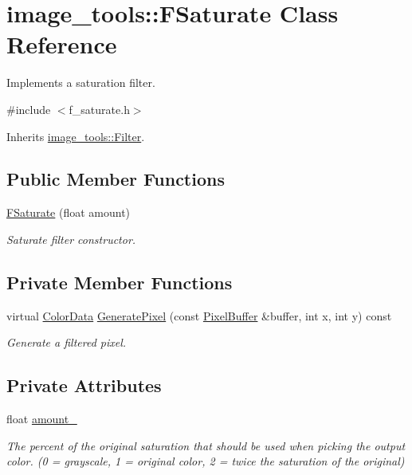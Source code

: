\hypertarget{classimage__tools_1_1FSaturate}{}\section{image\+\_\+tools\+:\+:F\+Saturate Class Reference}
\label{classimage__tools_1_1FSaturate}


Implements a saturation filter.  




{\ttfamily \#include $<$f\+\_\+saturate.\+h$>$}



Inherits \hyperlink{classimage__tools_1_1Filter}{image\+\_\+tools\+::\+Filter}.

\subsection*{Public Member Functions}
\begin{DoxyCompactItemize}
\item 
\hyperlink{classimage__tools_1_1FSaturate_a5940def93bf1851091ae93e949a34b7d}{F\+Saturate} (float amount)
\begin{DoxyCompactList}\small\item\em Saturate filter constructor. \end{DoxyCompactList}\end{DoxyCompactItemize}
\subsection*{Private Member Functions}
\begin{DoxyCompactItemize}
\item 
virtual \hyperlink{classimage__tools_1_1ColorData}{Color\+Data} \hyperlink{classimage__tools_1_1FSaturate_af576256575784ecbdf39109a0131e819}{Generate\+Pixel} (const \hyperlink{classimage__tools_1_1PixelBuffer}{Pixel\+Buffer} \&buffer, int x, int y) const 
\begin{DoxyCompactList}\small\item\em Generate a filtered pixel. \end{DoxyCompactList}\end{DoxyCompactItemize}
\subsection*{Private Attributes}
\begin{DoxyCompactItemize}
\item 
float \hyperlink{classimage__tools_1_1FSaturate_a76f7563fdee11d37e3ac640ced26bdd6}{amount\+\_\+}\hypertarget{classimage__tools_1_1FSaturate_a76f7563fdee11d37e3ac640ced26bdd6}{}\label{classimage__tools_1_1FSaturate_a76f7563fdee11d37e3ac640ced26bdd6}

\begin{DoxyCompactList}\small\item\em The percent of the original saturation that should be used when picking the output color. (0 = grayscale, 1 = original color, 2 = twice the saturation of the original) \end{DoxyCompactList}\end{DoxyCompactItemize}


